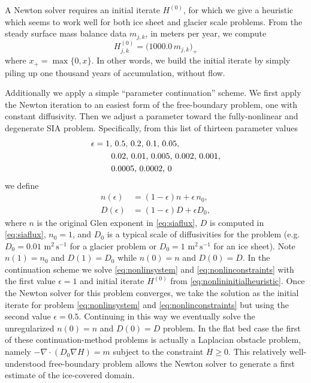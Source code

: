 \documentclass[twocolumn,letterpaper]{igs}
\newcommand{\Div}{\nabla\cdot}
\newcommand\eps{\epsilon}
\newcommand{\grad}{\nabla}
\begin{document}
A Newton solver requires an initial iterate $H^{(0)}$, for which we give a heuristic which seems to work well for both ice sheet and glacier scale problems.  From the steady surface mass balance data $m_{j,k}$, in meters per year, we compute
\begin{equation}
H_{j,k}^{(0)} = \big(1000.0\,m_{j,k}\big)_+  \label{eq:nonlininitialheuristic}
\end{equation}
where $x_+ = \max\{0,x\}$.  In other words, we build the initial iterate by simply piling up one thousand years of accumulation, without flow.

Additionally we apply a simple ``parameter continuation'' scheme.  We first apply the Newton iteration to an easiest form of the free-boundary problem, one with constant diffusivity.  Then we adjust a parameter toward the fully-nonlinear and degenerate SIA problem.  Specifically, from this list of thirteen parameter values
\begin{align}
\eps &= 1,\, 0.5,\, 0.2,\, 0.1,\, 0.05, \label{eq:continuationseq} \\
     &\qquad 0.02,\, 0.01,\, 0.005,\, 0.002,\, 0.001, \notag \\
     &\qquad 0.0005,\, 0.0002,\, 0 \notag
\end{align}
we define
\begin{align}
n(\eps) &= (1-\eps) n + \eps\, n_0,  \label{eq:continuationn} \\
D(\eps) &= (1-\eps) D + \eps D_0,  \label{eq:continuationD}
\end{align}
where $n$ is the original Glen exponent in \eqref{eq:siaflux}, $D$ is computed in \eqref{eq:siaflux}, $n_0=1$, and $D_0$ is a typical scale of diffusivities for the problem (e.g.~$D_0=0.01$ $\text{m}^2\,\text{s}^{-1}$ for a glacier problem or $D_0=1$ $\text{m}^2\,\text{s}^{-1}$ for an ice sheet).  Note $n(1)=n_0$ and $D(1)=D_0$ while $n(0)=n$ and $D(0)=D$.   In the continuation scheme we solve \eqref{eq:nonlinsystem} and \eqref{eq:nonlinconstraints} with the first value $\eps=1$ and initial iterate $H^{(0)}$ from \eqref{eq:nonlininitialheuristic}.  Once the Newton solver for this problem converges, we take the solution as the initial iterate for problem \eqref{eq:nonlinsystem} and \eqref{eq:nonlinconstraints} but using the second value $\eps=0.5$.  Continuing in this way we eventually solve the unregularized $n(0)=n$ and $D(0)=D$ problem.  In the flat bed case the first of these continuation-method problems is actually a Laplacian obstacle problem, namely $-\Div(D_0 \grad H) = m$ subject to the constraint $H\ge 0$.  This relatively well-understood free-boundary problem \citep{KinderlehrerStampacchia1980} allows the Newton solver to generate a first estimate of the ice-covered domain.
\end{document}
